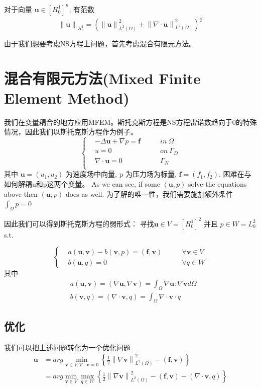 对于向量 $\textbf{u}\in [H^1_0]^n$, 
有范数 $$\left\|\textbf{u}\right\|_{H^1_0}=\left(\left\|\textbf{u}\right\|^2_{L^2(\Omega)}+\left\|\nabla \cdot \textbf{u}\right\|^2_{L^2(\Omega)}\right)^{\frac{1}{2}}$$

由于我们想要考虑NS方程上问题，首先考虑混合有限元方法。

\section{混合有限元方法(Mixed Finite Element Method)}
我们在变量耦合的地方应用MFEM。斯托克斯方程是NS方程雷诺数趋向于0的特殊情况，因此我们以斯托克斯方程作为例子。
$$\left\{
\begin{aligned}
    &-\Delta \textbf{u}+\nabla p = \textbf{f} \qquad &in\ \Omega\\
    &u=0\qquad &on \ \Gamma_D\\
    &\nabla \cdot \textbf{u} = 0\qquad &\Gamma_N\\
\end{aligned}
\right.$$
其中 $\textbf{u}=(u_1,u_2)$ 为速度场中向量, p 为压力场为标量, $\textbf{f}=(f_1, f_2)$. 困难在与如何解耦u和p这两个变量。
As we can see, if some $(\textbf{u}, p)$ solve the equations above then $(\textbf{u}, p)$ does as well. 
为了解的唯一性，我们需要施加额外条件 $\int_\Omega p=0$

因此我们可以得到斯托克斯方程的弱形式： 寻找$\textbf{u}\in V=[H^1_0]^2$ 并且 $p\in W=L^2_0$ s.t.

$$\left\{
    \begin{aligned}
        &a(\textbf{u},\textbf{v})-b(\textbf{v}, p)=(\textbf{f}, \textbf{v}) \qquad &\forall \textbf{v}\in V\\
        &b(\textbf{u}, q)=0 \qquad &\forall q\in W
    \end{aligned}
\right.$$
其中 $$\begin{aligned}
    &a(\textbf{u},\textbf{v})=(\nabla \textbf{u},\nabla \textbf{v})=\int_\Omega \nabla \textbf{u}:\nabla \textbf{v}d\Omega\\
    &b(\textbf{v}, q)=(\nabla\cdot \textbf{v}, q)=\int_\Omega \nabla\cdot \textbf{v}\cdot q
\end{aligned}$$

\subsection{优化}
我们可以把上述问题转化为一个优化问题
$$\begin{aligned}
    \textbf{u}&=arg \min_{\textbf{v}\in V, \nabla \cdot \textbf{v}=0}\left\{\frac{1}{2}\left\|\nabla \textbf{v}\right\|^2_{L^2(\Omega)}-(\textbf{f}, \textbf{v})\right\}\\
    &=arg \min_{\textbf{v}\in V} \max_{q\in W}\left\{\frac{1}{2}\left\|\nabla \textbf{v}\right\|^2_{L^2(\Omega)}-(\textbf{f}, \textbf{v}) -(\nabla \cdot \textbf{v}, q)\right\}
\end{aligned}$$

